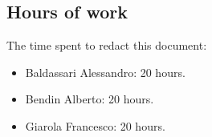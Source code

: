 \documentclass[a4paper,11pt]{report} %
\begin{document}
	\subsection{Hours of work} The time spent to redact this document:
		\begin{itemize}
			\item Baldassari Alessandro: 20 hours.
			\item Bendin Alberto: 20 hours.
			\item Giarola Francesco: 20 hours.
		\end{itemize}
\end{document}
